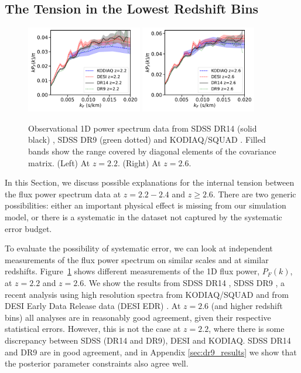 \subsection{The Tension in the Lowest Redshift Bins}
\label{sec:tension}

\begin{figure}
    \centering
    \includegraphics[width=0.45\textwidth]{figures/lymandata-z2.2.pdf}
    \includegraphics[width=0.45\textwidth]{figures/lymandata-z2.6.pdf}
    \caption{\label{fig:p1d_data}
    Observational 1D power spectrum data from SDSS DR14 (solid black) \protect\cite{2019JCAP...07..017C}, SDSS DR9 (green dotted) \protect\cite{2013A&A...559A..85P} and KODIAQ/SQUAD \protect\cite{2022MNRAS.509.2842K}. Filled bands show the range covered by diagonal elements of the covariance matrix. (Left) At $z=2.2$. (Right) At $z=2.6$.}
\end{figure}

In this Section, we discuss possible explanations for the internal tension between the flux power spectrum data at $z=2.2 - 2.4$ and $z \geq 2.6$. There are two generic possibilities: either an important physical effect is missing from our simulation model, or there is a systematic in the dataset not captured by the systematic error budget. 

To evaluate the possibility of systematic error, we can look at independent measurements of the flux power spectrum on similar scales and at similar redshifts. Figure~\ref{fig:p1d_data} shows different measurements of the 1D flux power, $P_F(k)$, at $z=2.2$ and $z=2.6$. We show the results from SDSS DR14 \cite{2019JCAP...07..017C}, SDSS DR9 \cite{2013A&A...559A..85P}, a recent analysis using high resolution spectra from KODIAQ/SQUAD \cite{2022MNRAS.509.2842K} and from DESI Early Data Release data (DESI EDR) \cite{2023arXiv230606316G}. At $z=2.6$ (and higher redshift bins) all analyses are in reasonably good agreement, given their respective statistical errors. However, this is not the case at $z=2.2$, where there is some 
discrepancy between SDSS (DR14 and DR9), DESI and KODIAQ. SDSS DR14 and DR9 are in good agreement, and in Appendix \ref{sec:dr9_results} we show that the posterior parameter constraints also agree well. 

